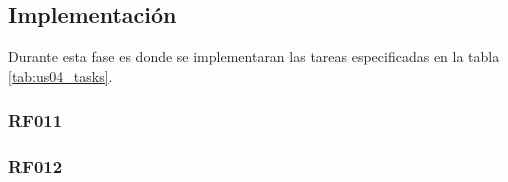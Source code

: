     


\subsection{Implementación}
\label{sub:implementacion_iteracion_1}

Durante esta fase es donde se implementaran las tareas especificadas en la tabla \ref{tab:us04_tasks}.

\subsubsection{RF011}
\label{subs:RF011}



\subsubsection{RF012}
\label{subs:RF012}


